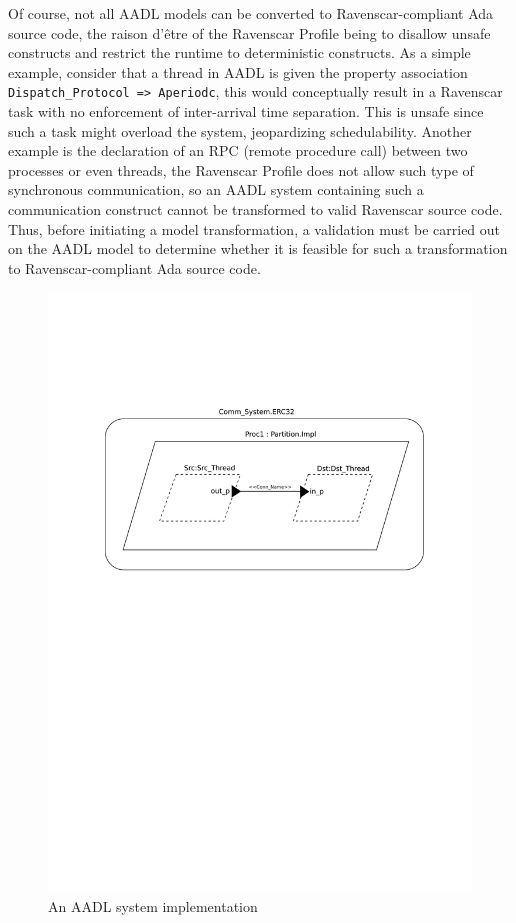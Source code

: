 Of course, not all AADL models can be converted to Ravenscar-compliant
Ada source code, the raison d'\^etre of the Ravenscar Profile being to
disallow unsafe constructs and restrict the runtime to deterministic
constructs. As a simple example, consider that a thread in AADL is
given the property association \texttt{Dispatch\_Protocol =>
  Aperiodc}, this would conceptually result in a Ravenscar task with
no enforcement of inter-arrival time separation. This is unsafe since
such a task might overload the system, jeopardizing
schedulability. Another example is the declaration of an RPC (remote
procedure call) between two processes or even threads, the Ravenscar
Profile does not allow such type of synchronous communication, so an
AADL system containing such a communication construct cannot be
transformed to valid Ravenscar source code. Thus, before initiating a
model transformation, a validation must be carried out on the AADL
model to determine whether it is feasible for such a transformation to
Ravenscar-compliant Ada source code.

\begin{figure}
\centering
\includegraphics[scale=0.7]{figs/aadl_ex}
\caption{An AADL system implementation}
\label{fig:aadl_ex}
\end{figure}

